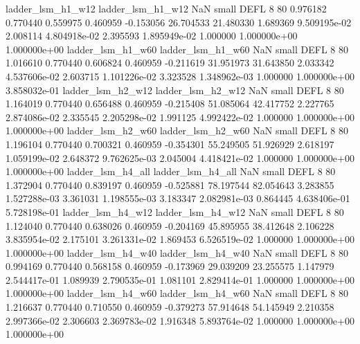        ladder_lsm_h1_w12        ladder_lsm_h1_w12                   NaN      small     DEFL                 8 80 0.976182       0.770440 0.559975       0.460959   -0.153056     26.704533     21.480330     1.689369   9.509195e-02  2.008114 4.804918e-02     2.395593   1.895949e-02            1.000000    1.000000e+00        1.000000e+00
       ladder_lsm_h1_w60        ladder_lsm_h1_w60                   NaN      small     DEFL                 8 80 1.016610       0.770440 0.606824       0.460959   -0.211619     31.951973     31.643850     2.033342   4.537606e-02  2.603715 1.101226e-02     3.323528   1.348962e-03            1.000000    1.000000e+00        3.858032e-01
       ladder_lsm_h2_w12        ladder_lsm_h2_w12                   NaN      small     DEFL                 8 80 1.164019       0.770440 0.656488       0.460959   -0.215408     51.085064     42.417752     2.227765   2.874086e-02  2.335545 2.205298e-02     1.991125   4.992422e-02            1.000000    1.000000e+00        1.000000e+00
       ladder_lsm_h2_w60        ladder_lsm_h2_w60                   NaN      small     DEFL                 8 80 1.196104       0.770440 0.700321       0.460959   -0.354301     55.249505     51.926929     2.618197   1.059199e-02  2.648372 9.762625e-03     2.045004   4.418421e-02            1.000000    1.000000e+00        1.000000e+00
       ladder_lsm_h4_all        ladder_lsm_h4_all                   NaN      small     DEFL                 8 80 1.372904       0.770440 0.839197       0.460959   -0.525881     78.197544     82.054643     3.283855   1.527288e-03  3.361031 1.198555e-03     3.183347   2.082981e-03            0.864445    4.638406e-01        5.728198e-01
       ladder_lsm_h4_w12        ladder_lsm_h4_w12                   NaN      small     DEFL                 8 80 1.124040       0.770440 0.638026       0.460959   -0.204169     45.895955     38.412648     2.106228   3.835954e-02  2.175101 3.261331e-02     1.869453   6.526519e-02            1.000000    1.000000e+00        1.000000e+00
       ladder_lsm_h4_w40        ladder_lsm_h4_w40                   NaN      small     DEFL                 8 80 0.994169       0.770440 0.568158       0.460959   -0.173969     29.039209     23.255575     1.147979   2.544417e-01  1.089939 2.790535e-01     1.081101   2.829414e-01            1.000000    1.000000e+00        1.000000e+00
       ladder_lsm_h4_w60        ladder_lsm_h4_w60                   NaN      small     DEFL                 8 80 1.216637       0.770440 0.710550       0.460959   -0.379273     57.914648     54.145949     2.210358   2.997366e-02  2.306603 2.369783e-02     1.916348   5.893764e-02            1.000000    1.000000e+00        1.000000e+00
